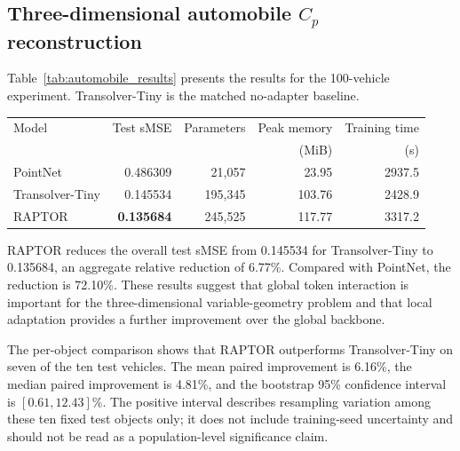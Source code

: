 \documentclass[a4paper,fleqn]{cas-sc}
\begin{document}
\subsection{Three-dimensional automobile \(C_p\) reconstruction}
\label{subsec:automobile_results}

Table~\ref{tab:automobile_results} presents the results for the 100-vehicle
experiment. Transolver-Tiny is the matched no-adapter baseline.

\begin{center}
  \begin{minipage}{0.94\linewidth}
    \centering
    \label{tab:automobile_results}
    \renewcommand{\arraystretch}{1.10}
    \setlength{\tabcolsep}{4pt}
    \begin{tabular}{lrrrr}
        \toprule
        Model
        & Test sMSE
        & Parameters
        & Peak memory
        & Training time \\
        &
        &
        & (MiB)
        & (s) \\
        \midrule
        PointNet
        & 0.486309 & 21,057  & 23.95  & 2937.5 \\
        Transolver-Tiny
        & 0.145534 & 195,345 & 103.76 & 2428.9 \\
        RAPTOR
        & \textbf{0.135684} & 245,525 & 117.77 & 3317.2 \\
        \bottomrule
    \end{tabular}
  \end{minipage}
\end{center}

RAPTOR reduces the overall test sMSE from 0.145534 for
Transolver-Tiny to 0.135684, an aggregate relative reduction of 6.77\%.
Compared with PointNet, the reduction is 72.10\%. These results suggest that
global token interaction is important for the three-dimensional
variable-geometry problem and that local adaptation provides a further improvement
over the global backbone.

The per-object comparison shows that RAPTOR
outperforms Transolver-Tiny on seven of the ten test vehicles. The mean
paired improvement is 6.16\%, the median paired improvement is 4.81\%, and
the bootstrap 95\% confidence interval is \([0.61,12.43]\%\). The positive
interval describes resampling variation among these ten fixed test objects
only; it does not include training-seed uncertainty and should not be read
as a population-level significance claim.
\end{document}

